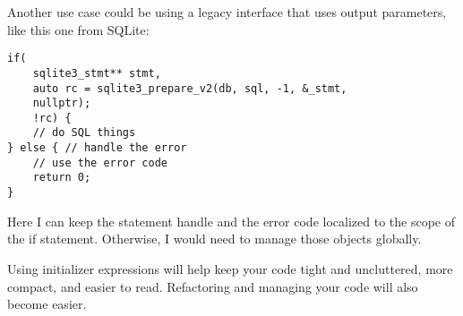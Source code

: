 Another use case could be using a legacy interface that uses output parameters, like this one from SQLite:

\begin{lstlisting}[style=styleCXX]
if(
	sqlite3_stmt** stmt,
	auto rc = sqlite3_prepare_v2(db, sql, -1, &_stmt,
	nullptr);
	!rc) {
	// do SQL things
} else { // handle the error
	// use the error code
	return 0;
}
\end{lstlisting}

Here I can keep the statement handle and the error code localized to the scope of the if statement. Otherwise, I would need to manage those objects globally.

Using initializer expressions will help keep your code tight and uncluttered, more compact, and easier to read. Refactoring and managing your code will also become easier.













